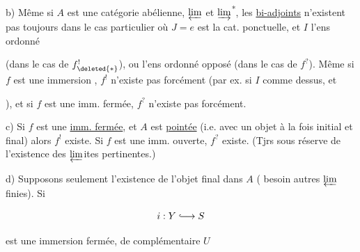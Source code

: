 b) Même si $A$ est une catégorie abélienne,  $\varprojlim$ et $\varinjlim$\textsuperscript{*}, les \uline{bi-adjoints} n'existent pas toujours   dans le cas particulier où $J=e$ est la cat. ponctuelle, et $I$ l'ens ordonné


(dans le cas de $f_{\deleted{*}}^{!}$), ou l'ens ordonné opposé (dans le cas de $f^{?}$). Même si  $f$ est une immersion , $f^{!}$ n'existe pas forcément (par ex.  si $I$ comme dessus, et


), et si $f$ est une imm. fermée, $f^{?}$ n'existe pas forcément.

c) Si $f$ est une \uline{imm. fermée}, et $A$ est \uline{pointée} (i.e. avec un objet à la fois initial et final) alors $f^{!}$ existe. Si $f$ est une imm. ouverte, $f^{?}$ existe. (Tjrs sous réserve de l'existence  des $\varprojlim$ites pertinentes.) 

d) Supposons seulement l'existence de l'objet final\unsure{\textsuperscript{*}} dans $A$ (  besoin autres $\varprojlim$ finies). Si 



\[
i:Y\lhook\joinrel\longrightarrow S
\]

est une immersion fermée, de complémentaire $U$


